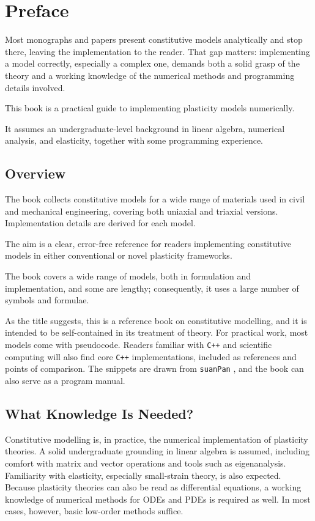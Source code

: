 \chapter{Preface}
Most monographs and papers present constitutive models analytically and stop there, leaving the implementation to the reader.
That gap matters: implementing a model correctly, especially a complex one, demands both a solid grasp of the theory and a working knowledge of the numerical methods and programming details involved.

This book is a practical guide to implementing plasticity models numerically.

It assumes an undergraduate-level background in linear algebra, numerical analysis, and elasticity, together with some programming experience.
\section{Overview}
The book collects constitutive models for a wide range of materials used in civil and mechanical engineering, covering both uniaxial and triaxial versions.
Implementation details are derived for each model.

The aim is a clear, error-free reference for readers implementing constitutive models in either conventional or novel plasticity frameworks.

The book covers a wide range of models, both in formulation and implementation, and some are lengthy; consequently, it uses a large number of symbols and formulae.

As the title suggests, this is a reference book on constitutive modelling, and it is intended to be self-contained in its treatment of theory.
For practical work, most models come with pseudocode.
Readers familiar with \texttt{C++} and scientific computing will also find core \texttt{C++} implementations, included as references and points of comparison.
The snippets are drawn from \texttt{suanPan} \cite{Chang2022}, and the book can also serve as a program manual.
\section{What Knowledge Is Needed?}
Constitutive modelling is, in practice, the numerical implementation of plasticity theories.
A solid undergraduate grounding in linear algebra is assumed, including comfort with matrix and vector operations and tools such as eigenanalysis.
Familiarity with elasticity, especially small-strain theory, is also expected.
Because plasticity theories can also be read as differential equations, a working knowledge of numerical methods for ODEs and PDEs is required as well.
In most cases, however, basic low-order methods suffice.

